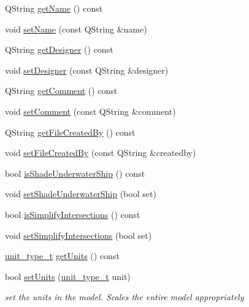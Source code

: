 \begin{DoxyCompactItemize}
\item 
Q\+String \hyperlink{classShipCAD_1_1ProjectSettings_adeadfbedd4733c4c242dafbe55935397}{get\+Name} () const 
\item 
void \hyperlink{classShipCAD_1_1ProjectSettings_acaa6149ff4c93c829a72a3a3d2ff5239}{set\+Name} (const Q\+String \&name)
\item 
Q\+String \hyperlink{classShipCAD_1_1ProjectSettings_a03844b7fff96e8ade21a0dc5ff72a1b6}{get\+Designer} () const 
\item 
void \hyperlink{classShipCAD_1_1ProjectSettings_abde123a71eba642ff1dbd62d547aa684}{set\+Designer} (const Q\+String \&designer)
\item 
Q\+String \hyperlink{classShipCAD_1_1ProjectSettings_a7687e8e358e8deb57e363ad8e5cfef17}{get\+Comment} () const 
\item 
void \hyperlink{classShipCAD_1_1ProjectSettings_a64e942847dd0838f04dc4ec32e9bc30e}{set\+Comment} (const Q\+String \&comment)
\item 
Q\+String \hyperlink{classShipCAD_1_1ProjectSettings_a8db64934b729181fbf65b767f6260bff}{get\+File\+Created\+By} () const 
\item 
void \hyperlink{classShipCAD_1_1ProjectSettings_a326e18ff53ba0f916d4d8cfab5a2d17f}{set\+File\+Created\+By} (const Q\+String \&createdby)
\item 
bool \hyperlink{classShipCAD_1_1ProjectSettings_a7b7fca3caf6e2dff52b96c818a87d13c}{is\+Shade\+Underwater\+Ship} () const 
\item 
void \hyperlink{classShipCAD_1_1ProjectSettings_a0f40362f42e6dfd4147d69573c00988f}{set\+Shade\+Underwater\+Ship} (bool set)
\item 
bool \hyperlink{classShipCAD_1_1ProjectSettings_afa26013859f923b3609221e6654fcbe9}{is\+Simplify\+Intersections} () const 
\item 
void \hyperlink{classShipCAD_1_1ProjectSettings_a138264f53da99f6a1765ea7aec95096a}{set\+Simplify\+Intersections} (bool set)
\item 
\hyperlink{namespaceShipCAD_ac6a7a28b4b063771afae92decb602da5}{unit\+\_\+type\+\_\+t} \hyperlink{classShipCAD_1_1ProjectSettings_af9e707de58afaa87f639c2426dbb1161}{get\+Units} () const 
\item 
bool \hyperlink{classShipCAD_1_1ProjectSettings_a4a994158dfec339efba2186d06467ff8}{set\+Units} (\hyperlink{namespaceShipCAD_ac6a7a28b4b063771afae92decb602da5}{unit\+\_\+type\+\_\+t} unit)
\begin{DoxyCompactList}\small\item\em set the units in the model. Scales the entire model appropriately \end{DoxyCompactList}\item 

\end{DoxyCompactItemize}
